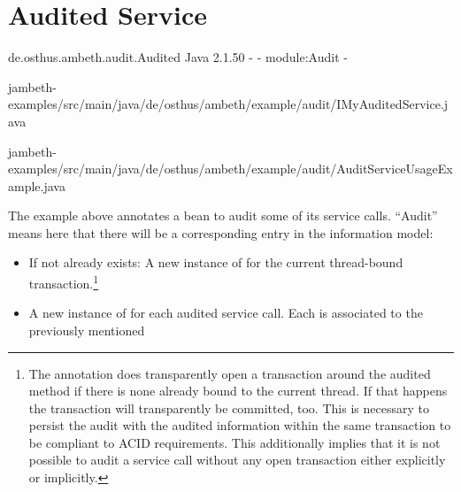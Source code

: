 \section{Audited Service}
\label{feature:AuditedService}

\feature
	{de.osthus.ambeth.audit.Audited}
	{Java}
	{2.1.50}
	{-}
	{-}
	{module:Audit}
	{-}
	
	{jambeth-examples/src/main/java/de/osthus/ambeth/example/audit/IMyAuditedService.java}

	{jambeth-examples/src/main/java/de/osthus/ambeth/example/audit/AuditServiceUsageExample.java}

The example above annotates a bean to audit some of its service calls. ``Audit'' means here that there will be a corresponding entry in the information model:

\begin{itemize}
	\item If not already exists: A new instance of  for the current thread-bound transaction.\footnote{The \type{\@Audited} annotation does transparently open a transaction around the audited method if there is none already bound to the current thread. If that happens the transaction will transparently be committed, too. This is necessary to persist the audit with the audited information within the same transaction to be compliant to ACID requirements. This additionally implies that it is not possible to audit a service call without any open transaction either explicitly or implicitly.}
	\item A new instance of  for each audited service call. Each  is associated to the previously mentioned 
\end{itemize}

